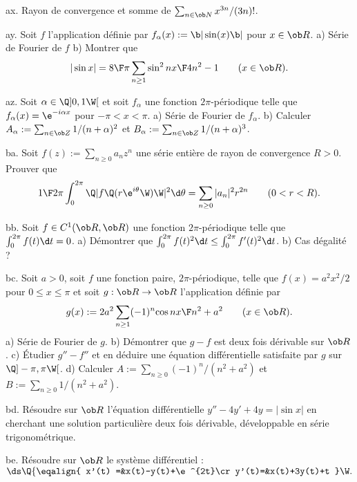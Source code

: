 \exo [Level=2,Fight=0,Learn=0,Field=\SériesEntières,Type=\Exercices,Origin=] ax. 
Rayon de convergence et somme de $\sum_{n\in\ob N}x^{3n}/(3n)!$. 

\exo [Level=2,Fight=0,Learn=0,Field=\SériesDeFourier,Type=\Exercices,Origin=] ay. 
Soit $f$ l'application 
définie par $f_\alpha(x):=\b|\sin (x)\b|$ pour $x\in\ob R$. \pn
a) Série de Fourier de $f$ \pn
b) Montrer que 
$$
|\sin x|={8\F\pi}\sum_{n\ge1}{\sin^2nx\F4n^2-1}\qquad(x\in\ob R).
$$

\exo [Level=2,Fight=1,Learn=0,Field=\SériesDeFourier,Type=\Exercices,Origin=] az. 
Soit $\alpha\in\Q]0,1\W[$ et soit $f_\alpha$ une fonction 
$2\pi$-périodique telle que $f_\alpha(x)=\e^{-i\alpha x}$ pour $-\pi<x<\pi$. \pn
a) Série de Fourier de $f_\alpha$. \pn
b) Calculer $A_\alpha:=\sum_{n\in\ob Z}1/(n+\alpha)^2$ et $B_\alpha:=\sum_{n\in\ob Z}1/(n+\alpha)^3$.

\exo [Level=2,Fight=1,Learn=0,Field=\SériesEntières,Type=\Exercices,Origin=] ba. 
Soit $f(z):=\sum_{n\ge0}a_nz^n$ une série entière de rayon de convergence $R>0$. Prouver que 
$$
{1\F2\pi}\int_0^{2\pi}\Q|f\Q(r\e^{i\theta}\W)\W|^2\d\theta=\sum_{n\ge0}|a_n|^2r^{2n}\qquad(0<r<R).
$$

\exo [Level=2,Fight=1,Learn=1,Field=\SériesDeFourier,Type=\Exercices,Origin=] bb. 
Soit $f\in\sc C^1(\ob R,\ob R)$ une fonction $2\pi$-périodique 
telle que $\int_0^{2\pi}f(t)\d t=0$. \pn
a) Démontrer que $\int_0^{2\pi}f(t)^2\d t\le \int_0^{2\pi}f'(t)^2\d t$. \pn
b) Cas dégalité ?

\exo [Level=2,Fight=2,Learn=1,Field=\SériesDeFonctions,Type=\Exercices,Origin=] bc. 
Soit $a>0$, soit $f$ une fonction paire, $2\pi$-périodique, telle que $f(x)=a^2x^2/2$ pour $0\le x\le \pi$ 
et soit $g:\ob R\to\ob R$ l'application définie par 
$$
g(x):=2a^2\sum_{n\ge1}(-1)^n{\cos nx\F n^2+a^2}\qquad(x\in\ob R).
$$ 
a) Série de Fourier de $g$. \pn
b) Démontrer que $g-f$ est deux fois dérivable sur $\ob R$. \pn
c) Étudier $g''-f''$ et en déduire une équation différentielle 
satisfaite par $g$ sur $\Q]-\pi,\pi\W[$. \pn
d) Calculer $A:=\sum_{n\ge0}(-1)^n/(n^2+a^2)$ et $B:=\sum_{n\ge0}1/(n^2+a^2)$. 

\exo [Level=2,Fight=1,Learn=1,Field=\SériesDeFourier,Type=\Exercices,Origin=,Indication=Utiliser le résultat a) de l'exercice \eqrefn{labelexoPTay}.] bd. 
Résoudre sur $\ob R$ l'équation différentielle $y''-4y'+4y=|\sin x|$ 
en cherchant une solution particulière deux fois dérivable, 
développable en série trigonométrique. 


\exo [Level=2,Fight=1,Learn=0,Field=\SystèmesDifférentiels,Type=\Exercices,Origin=] be. 
Résoudre sur $\ob R$ le système différentiel : 
$\ds \Q\{\eqalign{
x'(t)
=&x(t)-y(t)+\e^{2t}\cr
y'(t)=&x(t)+3y(t)+t
}\W.
$

